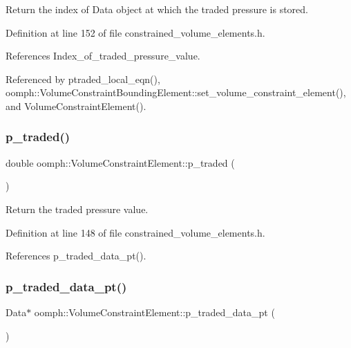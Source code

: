 Return the index of Data object at which the traded pressure is stored. 



Definition at line 152 of file constrained\+\_\+volume\+\_\+elements.\+h.



References Index\+\_\+of\+\_\+traded\+\_\+pressure\+\_\+value.



Referenced by ptraded\+\_\+local\+\_\+eqn(), oomph\+::\+Volume\+Constraint\+Bounding\+Element\+::set\+\_\+volume\+\_\+constraint\+\_\+element(), and Volume\+Constraint\+Element().

\mbox{\label{classoomph_1_1VolumeConstraintElement_aab138c0a3af1e72089d5bed31a633974}} 
\subsubsection{\texorpdfstring{p\+\_\+traded()}{p\_traded()}}
{\footnotesize\ttfamily double oomph\+::\+Volume\+Constraint\+Element\+::p\+\_\+traded (\begin{DoxyParamCaption}{ }\end{DoxyParamCaption})\hspace{0.3cm}{\ttfamily [inline]}}



Return the traded pressure value. 



Definition at line 148 of file constrained\+\_\+volume\+\_\+elements.\+h.



References p\+\_\+traded\+\_\+data\+\_\+pt().

\mbox{\label{classoomph_1_1VolumeConstraintElement_a60d17437a54648747c956b7a7067c592}} 
\subsubsection{\texorpdfstring{p\+\_\+traded\+\_\+data\+\_\+pt()}{p\_traded\_data\_pt()}}
{\footnotesize\ttfamily Data$\ast$ oomph\+::\+Volume\+Constraint\+Element\+::p\+\_\+traded\+\_\+data\+\_\+pt (\begin{DoxyParamCaption}{ }\end{DoxyParamCaption})\hspace{0.3cm}{\ttfamily [inline]}}



